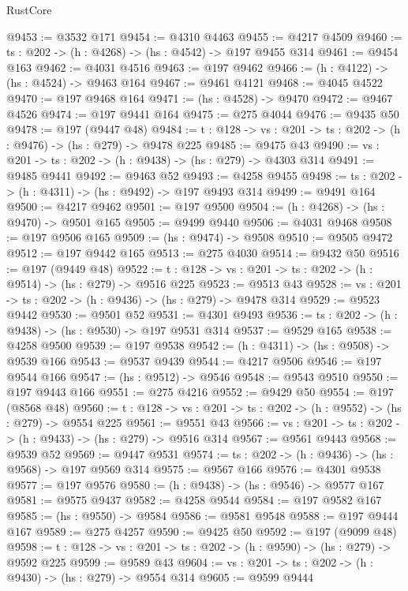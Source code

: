 \begin{lexlean}{RustCore}
\begin{coremodule}
@9453 := @3532 @171
@9454 := @4310 @4463
@9455 := @4217 @4509
@9460 := {ts : @202} -> (h : @4268) -> (hs : @4542) -> @197 @9455 @314
@9461 := @9454 @163
@9462 := @4031 @4516
@9463 := @197 @9462
@9466 := (h : @4122) -> (hs : @4524) -> @9463 @164
@9467 := @9461 @4121
@9468 := @4045 @4522
@9470 := @197 @9468 @164
@9471 := (hs : @4528) -> @9470
@9472 := @9467 @4526
@9474 := @197 @9441 @164
@9475 := @275 @4044
@9476 := @9435 @50
@9478 := @197 (@9447 @48)
@9484 := {t : @128} -> {vs : @201} -> {ts : @202} -> (h : @9476) -> (hs : @279) -> @9478 @225
@9485 := @9475 @43
@9490 := {vs : @201} -> {ts : @202} -> (h : @9438) -> (hs : @279) -> @4303 @314
@9491 := @9485 @9441
@9492 := @9463 @52
@9493 := @4258 @9455
@9498 := {ts : @202} -> (h : @4311) -> (hs : @9492) -> @197 @9493 @314
@9499 := @9491 @164
@9500 := @4217 @9462
@9501 := @197 @9500
@9504 := (h : @4268) -> (hs : @9470) -> @9501 @165
@9505 := @9499 @9440
@9506 := @4031 @9468
@9508 := @197 @9506 @165
@9509 := (hs : @9474) -> @9508
@9510 := @9505 @9472
@9512 := @197 @9442 @165
@9513 := @275 @4030
@9514 := @9432 @50
@9516 := @197 (@9449 @48)
@9522 := {t : @128} -> {vs : @201} -> {ts : @202} -> (h : @9514) -> (hs : @279) -> @9516 @225
@9523 := @9513 @43
@9528 := {vs : @201} -> {ts : @202} -> (h : @9436) -> (hs : @279) -> @9478 @314
@9529 := @9523 @9442
@9530 := @9501 @52
@9531 := @4301 @9493
@9536 := {ts : @202} -> (h : @9438) -> (hs : @9530) -> @197 @9531 @314
@9537 := @9529 @165
@9538 := @4258 @9500
@9539 := @197 @9538
@9542 := (h : @4311) -> (hs : @9508) -> @9539 @166
@9543 := @9537 @9439
@9544 := @4217 @9506
@9546 := @197 @9544 @166
@9547 := (hs : @9512) -> @9546
@9548 := @9543 @9510
@9550 := @197 @9443 @166
@9551 := @275 @4216
@9552 := @9429 @50
@9554 := @197 (@8568 @48)
@9560 := {t : @128} -> {vs : @201} -> {ts : @202} -> (h : @9552) -> (hs : @279) -> @9554 @225
@9561 := @9551 @43
@9566 := {vs : @201} -> {ts : @202} -> (h : @9433) -> (hs : @279) -> @9516 @314
@9567 := @9561 @9443
@9568 := @9539 @52
@9569 := @9447 @9531
@9574 := {ts : @202} -> (h : @9436) -> (hs : @9568) -> @197 @9569 @314
@9575 := @9567 @166
@9576 := @4301 @9538
@9577 := @197 @9576
@9580 := (h : @9438) -> (hs : @9546) -> @9577 @167
@9581 := @9575 @9437
@9582 := @4258 @9544
@9584 := @197 @9582 @167
@9585 := (hs : @9550) -> @9584
@9586 := @9581 @9548
@9588 := @197 @9444 @167
@9589 := @275 @4257
@9590 := @9425 @50
@9592 := @197 (@9099 @48)
@9598 := {t : @128} -> {vs : @201} -> {ts : @202} -> (h : @9590) -> (hs : @279) -> @9592 @225
@9599 := @9589 @43
@9604 := {vs : @201} -> {ts : @202} -> (h : @9430) -> (hs : @279) -> @9554 @314
@9605 := @9599 @9444

\end{coremodule}
\end{lexlean}
